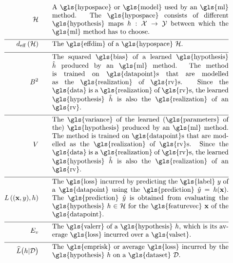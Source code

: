 \begin{align}
	\hypospace  \quad\quad & \parbox{.75\textwidth}{A \gls{hypospace} or \gls{model} used by an \gls{ml} method. 
		The \gls{hypospace} consists of different \gls{hypothesis} maps $\hypothesis: \featurespace \rightarrow \labelspace$ between which 
		the \gls{ml} method has to choose.}   \nonumber \\[2mm] \hline \nonumber\\[-5mm]
	\effdim{\hypospace}  \quad\quad & \parbox{.75\textwidth}{The \gls{effdim} of a \gls{hypospace} $\hypospace$.}   \nonumber \\[2mm] \hline \nonumber\\[-5mm]
	\biasterm^2 \quad\quad &\parbox{.75\textwidth}{
		The squared \gls{bias} of a learned \gls{hypothesis} $\learnthypothesis$ 
		produced by an \gls{ml} method. The method is trained on \gls{datapoint}s 
		that are modelled as the \gls{realization} of \gls{rv}s. Since the \gls{data} is a \gls{realization} 
		of \gls{rv}s, the learned \gls{hypothesis} $\learnthypothesis$ is also the \gls{realization} 
		of an \gls{rv}.} \nonumber  \nonumber \\[2mm] \hline \nonumber\\[-5mm]
	\varianceterm \quad\quad &\parbox{.75\textwidth}{The \gls{variance} of the learned 
		(\gls{parameters} of the) \gls{hypothesis} produced by an \gls{ml} method. 
		The method is trained on \gls{datapoint}s that are modelled as the \gls{realization} 
		of \gls{rv}s. Since the \gls{data} is a \gls{realization} of \gls{rv}s, the learned \gls{hypothesis} $\learnthypothesis$ is also the \gls{realization} 
		of an \gls{rv}.} \nonumber \nonumber \\[2mm] \hline \nonumber\\[-5mm]
	\lossfunc{(\featurevec,\truelabel)}{\hypothesis}  \quad\quad & \parbox{.75\textwidth}{The \gls{loss} incurred by predicting the 
		\gls{label} $\truelabel$ of a \gls{datapoint} using the \gls{prediction} $\hat{\truelabel}=h(\featurevec)$. The 
		\gls{prediction} $\hat{\truelabel}$ is obtained from evaluating the \gls{hypothesis} $\hypothesis \in \hypospace$ for 
		the \gls{featurevec} $\featurevec$ of the \gls{datapoint}.}    \nonumber  \nonumber \\[2mm] \hline \nonumber\\[-5mm] 
	\valerror \quad\quad &\parbox{.75\textwidth}{The \gls{valerr} of a \gls{hypothesis} $\hypothesis$, which is its 
		average \gls{loss} incurred over a \gls{valset}.}  \nonumber \\[2mm] \hline \nonumber\\[-5mm]
	\emperror\big(\hypothesis| \dataset \big) \quad\quad &\parbox{.75\textwidth}{The \gls{emprisk} or average \gls{loss} 
		incurred by the \gls{hypothesis} $\hypothesis$ on a \gls{dataset} $\dataset$.} \nonumber                           
\end{align}     

